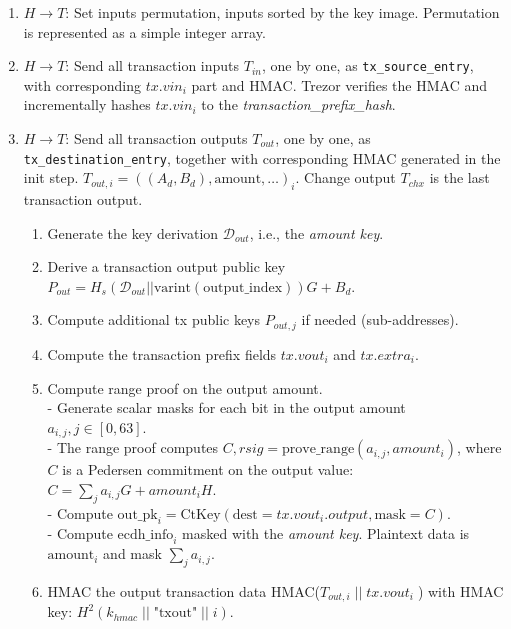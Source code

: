 \documentclass[]{article}
\begin{document}
\begin{enumerate}
	\item $H \rightarrow T$: Set inputs permutation, inputs sorted by the key image. Permutation is represented as a simple integer array.
	
	\item $H \rightarrow T$: Send all transaction inputs $T_{in}$, one by one, as \verb|tx_source_entry|, with corresponding $tx.vin_i$ part and HMAC. Trezor verifies the HMAC and incrementally hashes $tx.vin_i$ to the \emph{transaction\_prefix\_hash}.
	
	\item $H \rightarrow T$: Send all transaction outputs $T_{out}$, one by one, as \verb|tx_destination_entry|, together with corresponding HMAC generated in the init step. $T_{out,i} = ((A_d, B_d), \text{amount}, \dots)_i$. Change output $T_{chx}$ is the last transaction output.  
	\begin{enumerate}			
		\item Generate the key derivation $\mathcal{D}_{out}$, i.e., the \emph{amount key}.
		
		\item Derive a transaction output public key $P_{out} = H_s(\mathcal{D}_{out} || \text{varint}(\text{output\_index}))G + B_d$.
		
		\item Compute additional tx public keys $P_{out,j}$ if needed (sub-addresses).
		
        \item Compute the transaction prefix fields $tx.vout_i$ and $tx.extra_i$.
        
        \item Compute range proof on the output amount. \\
        - Generate scalar masks for each bit in the output amount $a_{i, j}, j \in [0, 63]$. \\
        - The range proof computes $C, rsig = \text{prove\_range}(a_{i, j}, amount_i)$, where $C$ is a Pedersen commitment on the output value: $C = \sum_{j}a_{i, j} G + amount_i H$. \\
        - Compute $\text{out\_pk}_i = \text{CtKey}(\text{dest}=tx.vout_i.output,\text{mask}=C)$.\\  
        - Compute $\text{ecdh\_info}_i$ masked with the \emph{amount key}. Plaintext data is $\text{amount}_i$ and mask $\sum_{j}a_{i, j}$.
        
        \item HMAC the output transaction data HMAC($T_{out,i} \; || \; tx.vout_i \; $) with HMAC key: $H^2(k_{hmac} \; || \; \text{"txout"} \; || \; i)$.
        

\end{enumerate}
\end{enumerate}
\end{document}

